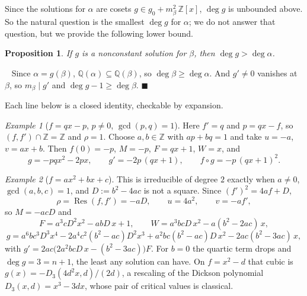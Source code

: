 \documentclass[10pt]{article}
\newcommand\Z{\mathbb{Z}}
\newcommand\Q{\mathbb{Q}}
\newcommand\1{\mathbb{1}}
\theoremstyle{plain}
\newtheorem{prop}{Proposition}
\theoremstyle{remark}
\newtheorem{example}{Example}
\theoremstyle{plain}
\newenvironment{pf}{%
  \par\addvspace{\medskipamount}\noindent\uwave{pf.}\ \ignorespaces}{%
  \unskip\nobreak\hfill$\blacksquare$\par\addvspace{\medskipamount}}
\begin{document}
Since the solutions for $\alpha$ are cosets $g \in g_{0} + m_{\beta}^{2}\,\Z[x]$,
$\deg g$ is unbounded above. So the natural question is the smallest
$\deg g$ for $\alpha$; we do not answer that question, but we provide the
following lower bound.

\begin{prop}\label{Pdeg}
  If $g$ is a nonconstant solution for $\beta$, then $\deg g > \deg \alpha$.
\end{prop}

\begin{pf}
  Since $\alpha = g(\beta)$, $\Q(\alpha) \subseteq \Q(\beta)$, so
  $\deg \beta \geq \deg \alpha$. And $g' \neq 0$ vanishes at $\beta$, so
  $m_{\beta} \mid g'$ and $\deg g - 1 \geq \deg \beta$.
\end{pf}

Each line below is a closed identity, checkable by expansion.

\begin{example}[$f = qx - p$, $p \neq 0$, $\gcd(p,q) = 1$]
  Here $f' = q$ and $p = qx - f$, so $(f,f') \cap \Z = \Z$ and $\rho = 1$.
  Choose $a, b \in \Z$ with $ap + bq = 1$ and take $u = -a$, $v = ax + b$. Then
  $f(0) = -p$, $M = -p$, $F = qx + 1$, $W = x$, and
  \[
    g = -pqx^{2} - 2px, \qquad
    g' = -2p\,(qx+1), \qquad
    f \circ g = -p\,(qx+1)^{2}.
  \]
\end{example}

\begin{example}[$f = ax^{2} + bx + c$]\label{Exquad}
  This is irreducible of degree $2$ exactly when $a \neq 0$, $\gcd(a,b,c) = 1$,
  and $D := b^{2} - 4ac$ is not a square. Since $(f')^{2} = 4af + D$,
  \[
    \rho = \operatorname{Res}(f,f') = -aD, \qquad u = 4a^{2}, \qquad v = -af',
  \]
  so $M = -acD$ and
  \[
    F = a^{3}cD^{2}x^{2} - abD\,x + 1, \qquad
    W = a^{3}bcD\,x^{2} - a(b^{2}-2ac)\,x ,
  \]
  \[
    g = a^{6}bc^{3}D^{3}x^{4} - 2a^{4}c^{2}(b^{2}-ac)D^{2}x^{3}
        + a^{2}bc(b^{2}-ac)D\,x^{2} - 2ac(b^{2}-3ac)\,x ,
  \]
  with $g' = 2ac\bigl(2a^{2}bcD\,x - (b^{2}-3ac)\bigr)F$. For $b = 0$ the
  quartic term drops and $\deg g = 3 = n+1$, the least any solution can have.
  On $f = x^{2} - d$ that cubic is $g(x) = -D_{3}(4d^{2}x, d)/(2d)$, a rescaling
  of the Dickson polynomial $D_{3}(x,d) = x^{3} - 3dx$, whose pair of critical
  values is classical.

\end{example}
\end{document}

